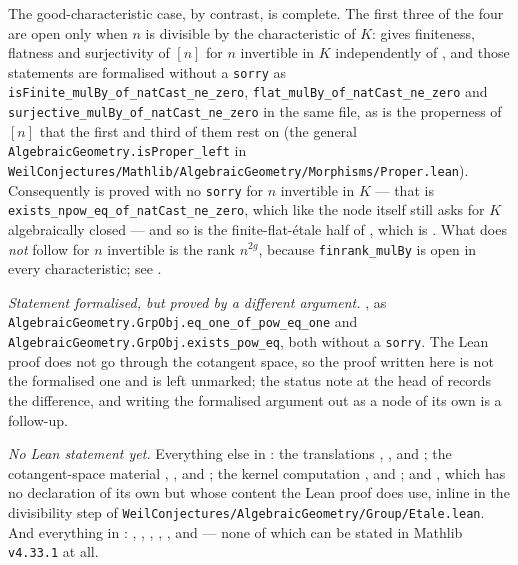 The good-characteristic case, by contrast, is complete.  The first three of the
four are open only when $n$ is divisible by the characteristic of $K$:
 gives finiteness, flatness and
surjectivity of $[n]$ for $n$ invertible in $K$ independently of
, and those statements are formalised without a
\texttt{sorry} as \texttt{isFinite\_mulBy\_of\_natCast\_ne\_zero},
\texttt{flat\_mulBy\_of\_natCast\_ne\_zero} and
\texttt{surjective\_mulBy\_of\_natCast\_ne\_zero} in the same file, as is the
properness of $[n]$ that the first and third of them rest on (the general
\texttt{AlgebraicGeometry.isProper\_left} in
\texttt{WeilConjectures/Mathlib/AlgebraicGeometry/Morphisms/Proper.lean}).
Consequently  is proved with no \texttt{sorry} for
$n$ invertible in $K$ --- that is
\texttt{exists\_npow\_eq\_of\_natCast\_ne\_zero}, which like the node itself
still asks for $K$ algebraically closed --- and so is the finite-flat-\'etale
half of , which is
.  What does \emph{not} follow for $n$
invertible is the rank $n^{2g}$, because \texttt{finrank\_mulBy} is open in
every characteristic; see .

\emph{Statement formalised, but proved by a different argument.}
, as
\texttt{AlgebraicGeometry.GrpObj.eq\_one\_of\_pow\_eq\_one} and
\texttt{AlgebraicGeometry.GrpObj.exists\_pow\_eq}, both without a
\texttt{sorry}.  The Lean proof does not go through the cotangent space, so the
proof written here is not the formalised one and is left unmarked; the status
note at the head of  records the difference, and
writing the formalised argument out as a node of its own is a follow-up.

\emph{No Lean statement yet.}  Everything else in :
the translations
, ,
 and
; the cotangent-space material
, ,
 and ; the
kernel computation ,
 and ; and
, which has no declaration of its own but whose
content the Lean proof does use, inline in the divisibility step of
\texttt{WeilConjectures/AlgebraicGeometry/Group/Etale.lean}.  And
everything in :
, ,
, ,
,  and
 --- none of which can be stated in Mathlib
\texttt{v4.33.1} at all.
